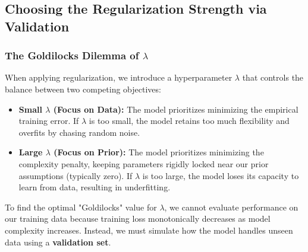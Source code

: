 \documentclass{article}
\begin{document}
\begin{table}[htbp]
\centering
\small
{}
\caption{Parameter vs. Hyperparameter Optimization Phases}
\label{tab:validation_phases}
\end{table}

\subsection{Choosing the Regularization Strength via Validation}

\subsubsection{The Goldilocks Dilemma of $\lambda$}
When applying regularization, we introduce a hyperparameter $\lambda$ that controls the balance between two competing objectives:
\begin{itemize}
    \item \textbf{Small $\lambda$ (Focus on Data):} The model prioritizes minimizing the empirical training error. If $\lambda$ is too small, the model retains too much flexibility and overfits by chasing random noise.
    \item \textbf{Large $\lambda$ (Focus on Prior):} The model prioritizes minimizing the complexity penalty, keeping parameters rigidly locked near our prior assumptions (typically zero). If $\lambda$ is too large, the model loses its capacity to learn from data, resulting in underfitting.
\end{itemize}

To find the optimal "Goldilocks" value for $\lambda$, we cannot evaluate performance on our training data because training loss monotonically decreases as model complexity increases. Instead, we must simulate how the model handles unseen data using a \textbf{validation set}.
\end{document}
